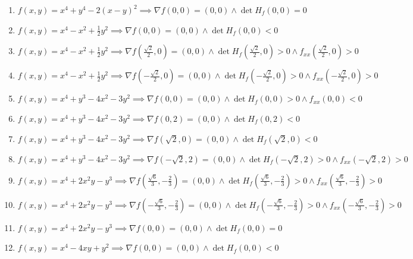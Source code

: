 \documentclass[11pt,a4paper]{article}
\begin{document}
\begin{enumerate}
\item $\displaystyle f(x, y) = x^{4} + y^{4} - 2(x - y)^{2} \implies \nabla f(0, 0) = (0, 0) \land \det H_{f}(0, 0) = 0$
\item $\displaystyle f(x, y) = x^{4} - x^{2} + \frac{1}{2} y^{2} \implies \nabla f(0, 0) = (0, 0) \land \det H_{f}(0, 0) < 0$
\item $\displaystyle f(x, y) = x^{4} - x^{2} + \frac{1}{2} y^{2} \implies \nabla f\left( \frac{\sqrt{2}}{2}, 0 \right) = (0, 0) \land \det H_{f}\left( \frac{\sqrt{2}}{2}, 0 \right) > 0 \land f_{xx}\left( \frac{\sqrt{2}}{2}, 0 \right) > 0$
\item $\displaystyle f(x, y) = x^{4} - x^{2} + \frac{1}{2} y^{2} \implies \nabla f\left( -\frac{\sqrt{2}}{2}, 0 \right) = (0, 0) \land \det H_{f}\left( -\frac{\sqrt{2}}{2}, 0 \right) > 0 \land f_{xx}\left( -\frac{\sqrt{2}}{2}, 0 \right) > 0$
\item $\displaystyle f(x, y) = x^{4} + y^{3} - 4x^{2} - 3y^{2} \implies \nabla f(0, 0) = (0, 0) \land \det H_{f}(0, 0) > 0 \land f_{xx}(0, 0) < 0$
\item $\displaystyle f(x, y) = x^{4} + y^{3} - 4x^{2} - 3y^{2} \implies \nabla f(0, 2) = (0, 0) \land \det H_{f}(0, 2) < 0$
\item $\displaystyle f(x, y) = x^{4} + y^{3} - 4x^{2} - 3y^{2} \implies \nabla f\left( \sqrt{2}, 0 \right) = (0, 0) \land \det H_{f}\left( \sqrt{2}, 0 \right) < 0$
\item $\displaystyle f(x, y) = x^{4} + y^{3} - 4x^{2} - 3y^{2} \implies \nabla f\left( -\sqrt{2}, 2 \right) = (0, 0) \land \det H_{f}\left( -\sqrt{2}, 2 \right) > 0 \land f_{xx}\left( -\sqrt{2}, 2 \right) > 0$
\item $\displaystyle f(x, y) = x^{4} + 2x^{2} y - y^{3} \implies \nabla f\left( \frac{\sqrt{6}}{3}, -\frac{2}{3} \right) = (0, 0) \land \det H_{f}\left( \frac{\sqrt{6}}{3}, -\frac{2}{3} \right) > 0 \land f_{xx}\left( \frac{\sqrt{6}}{3}, -\frac{2}{3} \right) > 0$
\item $\displaystyle f(x, y) = x^{4} + 2x^{2} y - y^{3} \implies \nabla f\left( -\frac{\sqrt{6}}{3}, -\frac{2}{3} \right) = (0, 0) \land \det H_{f}\left( -\frac{\sqrt{6}}{3}, -\frac{2}{3} \right) > 0 \land f_{xx}\left( -\frac{\sqrt{6}}{3}, -\frac{2}{3} \right) > 0$
\item $\displaystyle f(x, y) = x^{4} + 2x^{2} y - y^{3} \implies \nabla f(0, 0) = (0, 0) \land \det H_{f}(0, 0) = 0$
\item $\displaystyle f(x, y) = x^{4} - 4xy + y^{2} \implies \nabla f(0, 0) = (0, 0) \land \det H_{f}(0, 0) < 0$

\end{enumerate}
\end{document}
